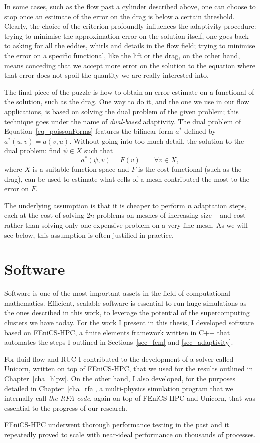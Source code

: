 In some cases, such as the flow past a cylinder described above, one can
choose to stop once an estimate of the error on the drag is below a
certain threshold.
Clearly, the choice of the criterion profoundly influences
the adaptivity procedure: trying to minimise the approximation error on
the solution itself, one goes back to asking for all the eddies, whirls
and details in the flow field; trying to minimise the error on a specific
functional, like the lift or the drag, on the other hand, means conceding
that we accept more error on the solution to the equation where that
error does not spoil the quantity we are really interested into.

The final piece of the puzzle is how to obtain an error estimate on a
functional of the solution, such as the drag.
One way to do it, and the one we use in our flow applications, is based
on solving the dual problem of the given problem; this technique goes under the
name of \emph{dual-based} adaptivity.
The dual problem of Equation~\eqref{eq_poissonForms} features the
bilinear form \(a^*\) defined by \(a^*(u, v) = a(v, u)\).
Without going into too much detail, the solution to the dual problem:
find \(\psi \in X\) such that
\begin{equation}
  a^*(\psi, v) = F(v) \qquad \forall v \in X,
  \label{eq_poissonDual}
\end{equation}
where \(X\) is a suitable function space and \(F\) is the cost functional
(such as the drag), can be used to estimate what cells of a mesh
contributed the most to the error on \(F\).

The underlying assumption is that it is cheaper to perform \(n\)
adaptation steps, each at the cost of solving \(2n\) problems on meshes of
increasing size -- and cost -- rather than solving only one expensive
problem on a very fine mesh.
As we will see below, this assumption is often justified in practice.

\section{Software}
\label{sec_software}
Software is one of the most important assets in the field of computational mathematics.
Efficient, scalable software is essential to run huge simulations as the ones described in this work, to leverage the potential of the supercomputing clusters we have today.
For the work I present in this thesis, I developed software based on FEniCS-HPC, a finite elements framework written in C++ that automates the steps I outlined in Sections~\ref{sec_fem} and \ref{sec_adaptivity}.

For fluid flow and RUC I contributed to the development of a solver called Unicorn, written on top of FEniCS-HPC, that we used for the results outlined in Chapter~\ref{cha_hlpw}.
On the other hand, I also developed, for the purposes detailed in Chapter~\ref{cha_rfa}, a multi-physics simulation program that we internally call \emph{the RFA code}, again on top of FEniCS-HPC and Unicorn, that was essential to the progress of our research.

FEniCS-HPC underwent thorough performance testing in the past and it repeatedly proved to scale with near-ideal performance on thousands of processes.
